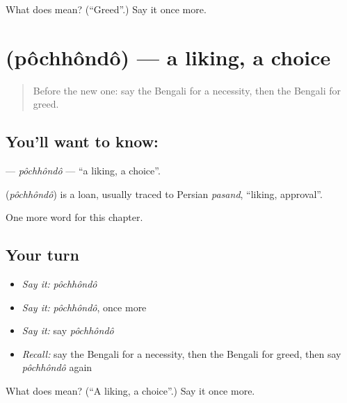\begin{tcolorbox}[breakable,colback=teal!4,colframe=teal!35!black,title={Before you move on}]
What does  mean? (\textquotedblleft{}Greed\textquotedblright{}.) Say it once more.
\end{tcolorbox}
\section[\texorpdfstring{\bn{পছন্দ} (pôchhôndô)}{পছন্দ (pôchhôndô)}]{ (pôchhôndô) — a liking, a choice}

\label{lesson:BN-C97-pochhondo}



\begin{quote}
Before the new one: say the Bengali for a necessity, then the Bengali for greed.
\end{quote}

\subsection*{You'll want to know: }
\textbf{} — \emph{pôchhôndô} — \textquotedblleft{}a liking, a choice\textquotedblright{}.

\begin{cousinweb}
\textbf{} (\emph{pôchhôndô}) is a loan, usually traced to Persian \emph{pasand}, \textquotedblleft{}liking, approval\textquotedblright{}.
\end{cousinweb}

\begin{grammarlens}[title={What you've built}]
One more word for this chapter.
\end{grammarlens}

\subsection*{Your turn}
\begin{itemize}
\raggedright
  \item \emph{Say it:} \emph{pôchhôndô}
  \item \emph{Say it:} \emph{pôchhôndô}, once more
  \item \emph{Say it:} say \emph{pôchhôndô}
  \item \emph{Recall:} say the Bengali for a necessity, then the Bengali for greed, then say \emph{pôchhôndô} again
\end{itemize}

\begin{tcolorbox}[breakable,colback=teal!4,colframe=teal!35!black,title={Before you move on}]
What does  mean? (\textquotedblleft{}A liking, a choice\textquotedblright{}.) Say it once more.
\end{tcolorbox}
